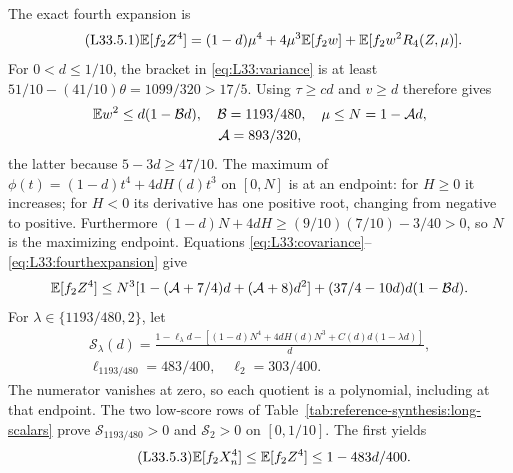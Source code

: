 The exact fourth expansion is
\begin{equation}\tag{L33.5.1}\label{eq:L33:fourthexpansion}
\mathbb E[f_2Z^4]=(1-d)\mu^4+4\mu^3\mathbb E[f_2w]
+\mathbb E[f_2w^2R_4(Z,\mu)].
\end{equation}
For $0<d\le1/10$, the bracket in \eqref{eq:L33:variance} is at least
$51/10-(41/10)\theta=1099/320>17/5$.
Using $\tau\ge cd$ and $v\ge d$ therefore gives
\[
\begin{gathered}
\mathbb E w^2\le d(1-\mathcal B d),\quad \mathcal B=1193/480,\quad \mu\le N=1-\mathcal A d,\\
\mathcal A=893/320,
\end{gathered}
\]
the latter because $5-3d\ge47/10$. The maximum of
$\phi(t)=(1-d)t^4+4dH(d)t^3$ on $[0,N]$ is at an endpoint:
for $H\ge0$ it increases; for $H<0$ its derivative has one positive
root, changing from negative to positive. Furthermore
$(1-d)N+4dH\ge(9/10)(7/10)-3/40>0$, so $N$ is the maximizing
endpoint. Equations \eqref{eq:L33:covariance}--\eqref{eq:L33:fourthexpansion} give
\[
\mathbb E[f_2Z^4]\le
N^3[1-(\mathcal A+7/4)d+(\mathcal A+8)d^2]
+(37/4-10d)d(1-\mathcal B d).
\]
For \(\lambda\in\{1193/480,2\}\), let
\[
\begin{gathered}
 \mathcal S_\lambda(d)=\frac{1-\ell_\lambda d-
 [(1-d)N^4+4dH(d)N^3+C(d)d(1-\lambda d)]}{d},\\
 \ell_{1193/480}=483/400,\quad \ell_2=303/400.
\end{gathered}
\]
The numerator vanishes at zero, so each quotient is a polynomial,
including at that endpoint. The two low-score rows of
Table~\ref{tab:reference-synthesis:long-scalars} prove
\(\mathcal S_{1193/480}>0\) and \(\mathcal S_2>0\)
on \([0,1/10]\). The first yields
\begin{equation}\tag{L33.5.3}\label{eq:L33:small}
\mathbb E[f_2X_n^4]\le\mathbb E[f_2Z^4]\le1-483d/400.
\end{equation}

